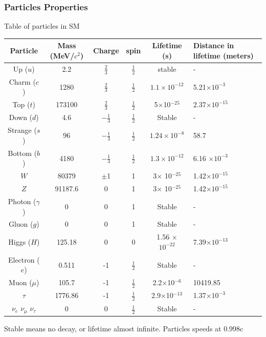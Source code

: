 \documentclass[11pt]{beamer}
\begin{document}
\begin{frame}
\frametitle{Particles Properties}
Table of particles in SM
\begin{table}
\tiny{\renewcommand{\arraystretch}{1.5}
\begin{tabular}{|c|c|c|c|c|p{2.5cm}|}
\hline 	
Particle	& Mass (MeV/$c^2$) &Charge & spin &Lifetime (s) & Distance in lifetime (meters) \\ 
\hline 
Up ($u$)	& 2.2 & $\frac{2}{3}$ & $\frac{1}{2}$ & stable & -\\ 
\hline 	
Charm ($c$)	& 1280 &$\frac{2}{3}$ & $\frac{1}{2}$ & $ 1.1 \times 10^{-12}$ & 5.21$\times 10^{-3}$ \\ 
\hline 
Top	($t$)& 173100 & $\frac{2}{3}$ & $\frac{1}{2}$ & 5$\times$10$^{-25}$ &2.37$\times 10^{-15}$  \\ 
\hline 
Down ($d$)	& 4.6 &$-\frac{1}{3}$ & $\frac{1}{2}$ & Stable & - \\ 
\hline 
Strange ($s$)	& 96 &$-\frac{1}{3}$ & $\frac{1}{2}$ &$1.24 \times 10^{-8}$ & 58.7 \\ 
\hline 
Bottom ($b$)	& 4180 &$-\frac{1}{3}$ & $\frac{1}{2}$ &$1.3 \times 10^{-12}$  & 6.16 $\times 10^{-3}$\\ 
\hline 
$W$ 	& 80379 &$\pm$1 & 1 & 3$\times$ 10$^{-25}$ & 1.42$\times 10^{-15}$\\ 
\hline 
$Z$ & 91187.6 &0 & 1 & 3$\times$ 10$^{-25}$ &1.42$\times 10^{-15}$ \\ 
\hline
Photon ($\gamma$) & 0 &0 & 1&Stable & - \\ 
\hline
Gluon ($g$)	& 0 &0 & 1&Stable & - \\ 
\hline 
Higgs ($H$)	& 125.18 &0 & 0& 1.56 $\times$ $10^{-22}$ & 7.39$\times 10^{-13}$ \\ 
\hline 
Electron ($e$)& 0.511 & -1 &  $\frac{1}{2}$& Stable & - \\ 
\hline 
Muon ($\mu$)	& 105.7 & -1 & $\frac{1}{2}$ & 2.2$\times$10$^{-6}$ & 10419.85 \\ 
\hline 
$\tau$	& 1776.86 &-1 & $\frac{1}{2}$ & 2.9$\times$10$^{-13}$ & 1.37$\times 10^{-3}$\\ 	
\hline 
$\nu_e$	$\nu_\mu$ $\nu_\tau$& 0 & 0 & $\frac{1}{2}$ & Stable & -\\
\hline 
\end{tabular} 
}
\end{table}
\tiny{Stable means no decay, or lifetime almost infinite. Particles speeds at 0.998c}
\end{frame}
\end{document}
